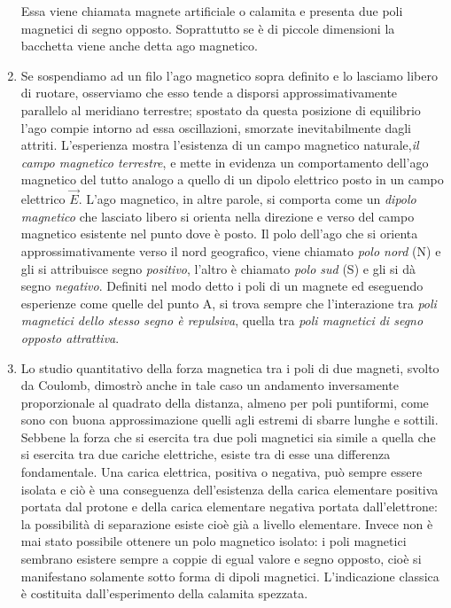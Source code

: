 \documentclass[class=book, crop=false, oneside, 12pt]{standalone}
\begin{document}
\begin{enumerate}
    Essa viene chiamata magnete artificiale o calamita e presenta due poli magnetici di segno opposto. 
    Soprattutto se è di piccole dimensioni la bacchetta viene anche detta ago magnetico. 
    \item Se sospendiamo ad un filo l'ago magnetico sopra definito e lo lasciamo libero di ruotare, osserviamo che esso tende a disporsi approssimativamente parallelo al meridiano terrestre; spostato da questa posizione di equilibrio l'ago compie intorno ad essa oscillazioni, smorzate inevitabilmente dagli attriti. 
    L'esperienza mostra l'esistenza di un campo magnetico naturale,\emph{il campo magnetico terrestre}, e mette in evidenza un comportamento dell'ago magnetico del tutto analogo a quello di un dipolo elettrico posto in un campo elettrico \(\overrightarrow{E}\). 
    L'ago magnetico, in altre parole, si comporta come un \emph{dipolo magnetico} che lasciato libero si orienta nella direzione e verso del campo magnetico esistente nel punto dove è posto. 
    Il polo dell'ago che si orienta approssimativamente verso il nord geografico, viene chiamato \emph{polo nord} (N) e  gli si attribuisce segno \emph{positivo}, l'altro è chiamato \emph{polo sud} (S) e  gli si dà segno \emph{negativo}. 
    Definiti nel modo detto i poli di un magnete ed eseguendo esperienze come quelle del punto A, si trova sempre che l'interazione tra \emph{poli magnetici dello stesso segno è repulsiva}, quella tra \emph{poli magnetici di segno opposto attrattiva}.
    \item Lo studio quantitativo della forza magnetica tra i poli di due magneti, svolto da Coulomb, dimostrò anche in tale caso un andamento inversamente proporzionale al quadrato della distanza, almeno per poli puntiformi, come sono con buona approssimazione quelli agli estremi di sbarre lunghe e sottili. 
    Sebbene la forza che si esercita tra due poli magnetici sia simile a quella che si esercita tra due cariche elettriche, esiste tra di esse una differenza fondamentale. 
    Una carica elettrica, positiva o negativa, può sempre essere isolata e ciò è una conseguenza dell'esistenza della carica elementare positiva portata dal protone e della carica elementare negativa portata dall'elettrone: la possibilità di separazione esiste cioè già a livello elementare. 
    Invece non è mai stato possibile ottenere un polo magnetico isolato: i poli magnetici sembrano esistere sempre a coppie di egual valore e segno opposto, cioè si manifestano solamente sotto forma di dipoli magnetici. 
    L'indicazione classica è costituita dall'esperimento della calamita spezzata. 

\end{enumerate}
\end{document}
